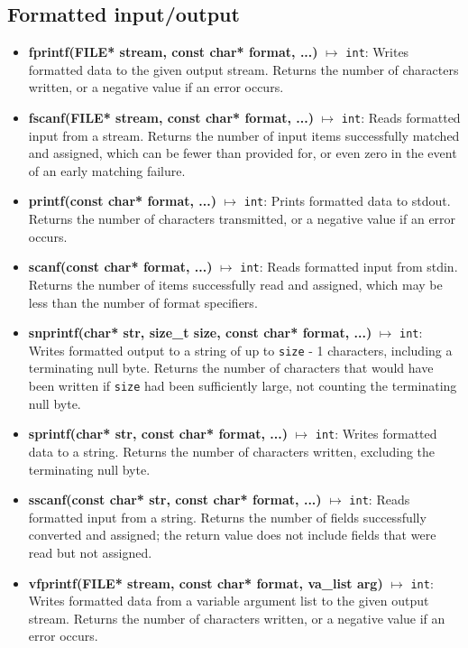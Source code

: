 \documentclass{report}
\begin{document}
    \subsection{Formatted input/output}
    \begin{itemize}
        \item \textbf{fprintf(FILE* stream, const char* format, ...)} $\mapsto$ \texttt{int}: Writes formatted data to the given output stream. Returns the number of characters written, or a negative value if an error occurs.
        \item \textbf{fscanf(FILE* stream, const char* format, ...)} $\mapsto$ \texttt{int}: Reads formatted input from a stream. Returns the number of input items successfully matched and assigned, which can be fewer than provided for, or even zero in the event of an early matching failure.
        \item \textbf{printf(const char* format, ...)} $\mapsto$ \texttt{int}: Prints formatted data to stdout. Returns the number of characters transmitted, or a negative value if an error occurs.
        \item \textbf{scanf(const char* format, ...)} $\mapsto$ \texttt{int}: Reads formatted input from stdin. Returns the number of items successfully read and assigned, which may be less than the number of format specifiers.
        \item \textbf{snprintf(char* str, size\_t size, const char* format, ...)} $\mapsto$ \texttt{int}: Writes formatted output to a string of up to \texttt{size} - 1 characters, including a terminating null byte. Returns the number of characters that would have been written if \texttt{size} had been sufficiently large, not counting the terminating null byte.
        \item \textbf{sprintf(char* str, const char* format, ...)} $\mapsto$ \texttt{int}: Writes formatted data to a string. Returns the number of characters written, excluding the terminating null byte.
        \item \textbf{sscanf(const char* str, const char* format, ...)} $\mapsto$ \texttt{int}: Reads formatted input from a string. Returns the number of fields successfully converted and assigned; the return value does not include fields that were read but not assigned.
        \item \textbf{vfprintf(FILE* stream, const char* format, va\_list arg)} $\mapsto$ \texttt{int}: Writes formatted data from a variable argument list to the given output stream. Returns the number of characters written, or a negative value if an error occurs.

\end{itemize}
\end{document}
